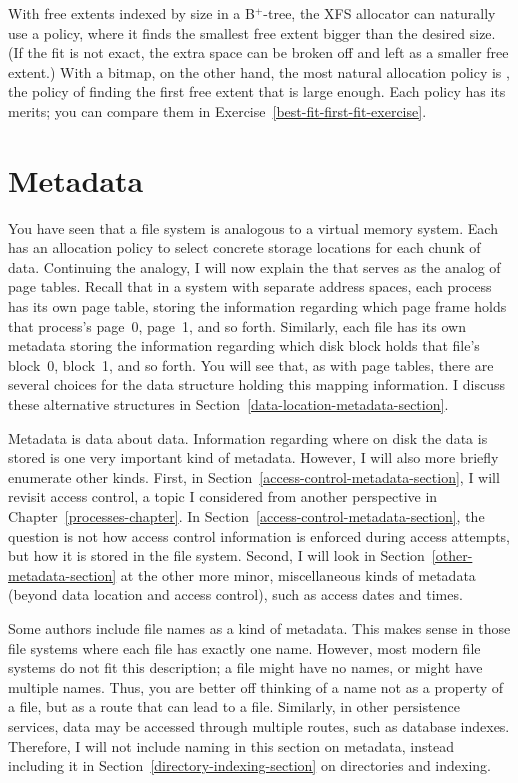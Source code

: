 With free extents indexed by size in a B${}^+$-tree, the XFS allocator can
naturally use a  policy, where it finds the smallest
free extent bigger than the desired size.  (If the fit is not exact,
the extra space can be broken off and left as a smaller free extent.)
With a bitmap, on the other hand, the most natural allocation policy
is , the policy of finding the first free extent that is
large enough.  Each policy has its merits; you can compare them in
Exercise~\ref{best-fit-first-fit-exercise}.

\section{Metadata}\label{metadata-section}

You have seen that a file system is analogous to a virtual memory
system.  Each has an allocation policy to select concrete storage
locations for each chunk of data.  Continuing the analogy, I will now
explain the  that serves as the analog of page tables.  Recall that in a system with
separate address spaces, each process has its own page table, storing
the information regarding which page frame holds that process's page~0,
page~1, and so forth.  Similarly, each file has its
own metadata storing the information regarding which disk block holds
that file's block~0, block~1, and so forth.  You will see that, as with page
tables, there are several choices for the data structure holding this
mapping information.  I discuss these alternative structures in
Section~\ref{data-location-metadata-section}.

Metadata is data about data.  Information regarding where on disk the
data is stored is one very important kind of metadata.  However, I
will also more briefly enumerate other kinds.
First, in Section~\ref{access-control-metadata-section}, I will
revisit access control, a topic I considered
from another perspective in Chapter~\ref{processes-chapter}.  In Section~\ref{access-control-metadata-section}, the question
is not how access control information is enforced during access
attempts, but how it is stored in the file system.  Second, I will
look in Section~\ref{other-metadata-section} at the other more minor, miscellaneous kinds of metadata (beyond
data location and access control), such as access dates and times.

Some authors include file names as a kind of metadata.  This makes
sense in those file systems where each file has exactly one name.
However, most modern file systems do not fit this description; a file
might have no names, or might have multiple names.  Thus, you are
better off thinking of a name not as a property of a file, but as a
route that can lead to a file.  Similarly, in other persistence
services, data may be accessed through multiple routes, such as
database indexes.  Therefore, I will not include naming in this
section on metadata, instead including it in Section~\ref{directory-indexing-section} on
directories and indexing.

